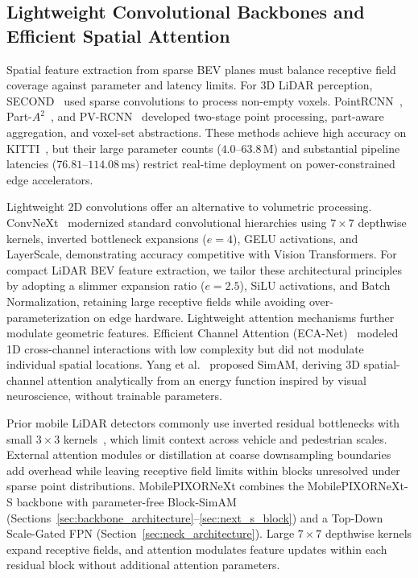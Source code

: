 \subsection{Lightweight Convolutional Backbones and Efficient Spatial Attention}
\label{sec:rel_backbone_attention}

Spatial feature extraction from sparse BEV planes must balance receptive field coverage against parameter and latency limits. For 3D LiDAR perception, SECOND~\cite{yan2018second} used sparse convolutions to process non-empty voxels. PointRCNN~\cite{shi2019pointrcnn}, Part-$A^2$~\cite{shi2020part}, and PV-RCNN~\cite{shi2020pvrcnn} developed two-stage point processing, part-aware aggregation, and voxel-set abstractions. These methods achieve high accuracy on KITTI~\cite{geiger2012kitti}, but their large parameter counts ($4.0\text{--}63.8\,\text{M}$) and substantial pipeline latencies ($76.81\text{--}114.08\,\text{ms}$) restrict real-time deployment on power-constrained edge accelerators.

Lightweight 2D convolutions offer an alternative to volumetric processing. ConvNeXt~\cite{liu2022convnext} modernized standard convolutional hierarchies using $7 \times 7$ depthwise kernels, inverted bottleneck expansions ($e=4$), GELU activations, and LayerScale, demonstrating accuracy competitive with Vision Transformers. For compact LiDAR BEV feature extraction, we tailor these architectural principles by adopting a slimmer expansion ratio ($e=2.5$), SiLU activations, and Batch Normalization, retaining large receptive fields while avoiding over-parameterization on edge hardware. Lightweight attention mechanisms further modulate geometric features. Efficient Channel Attention (ECA-Net)~\cite{wang2020eca} modeled 1D cross-channel interactions with low complexity but did not modulate individual spatial locations. Yang et al.~\cite{yang2021simam} proposed SimAM, deriving 3D spatial-channel attention analytically from an energy function inspired by visual neuroscience, without trainable parameters.

Prior mobile LiDAR detectors commonly use inverted residual bottlenecks with small $3 \times 3$ kernels~\cite{nguyen2024indoor}, which limit context across vehicle and pedestrian scales. External attention modules or distillation at coarse downsampling boundaries~\cite{tran2026rubber} add overhead while leaving receptive field limits within blocks unresolved under sparse point distributions. MobilePIXORNeXt combines the MobilePIXORNeXt-S backbone with parameter-free Block-SimAM (Sections~\ref{sec:backbone_architecture}--\ref{sec:next_s_block}) and a Top-Down Scale-Gated FPN (Section~\ref{sec:neck_architecture}). Large $7 \times 7$ depthwise kernels expand receptive fields, and attention modulates feature updates within each residual block without additional attention parameters.

